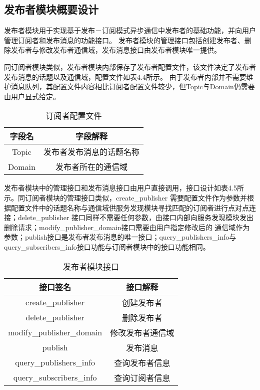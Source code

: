 \subsection{发布者模块概要设计}
发布者模块用于实现基于发布－订阅模式异步通信中发布者的基础功能，并向用户管理订阅者和发布消息的功能接口。
发布者模块的管理接口包括创建发布者、删除发布者与修改发布者通信域，发布消息接口由发布者模块唯一提供。

同订阅者模块类似，发布者模块内部保存了发布者配置文件，该文件决定了发布者发布消息的话题以及通信域，配置文件如表4.4所示。
由于发布者内部并不需要维护消息队列，其配置文件内容相比订阅者配置文件较少，但Topic与Domain仍需要由用户显式给定。
\begin{table}[htb]
  \centering\small
  \caption{订阅者配置文件}
  \label{tab:exampletable}
  \begin{tabular}{cc}
    \toprule
    字段名 & 字段解释 \\
    \midrule
    Topic & 发布者发布消息的话题名称\\
    Domain & 发布者所在的通信域\\
    \bottomrule
  \end{tabular}
\end{table}

发布者模块中的管理接口和发布消息接口由用户直接调用，接口设计如表4.5所示。同订阅者模块的管理接口类似，create\_publisher
需要配置文件作为参数并根据配置文件中的话题名称与通信域供服务发现模块寻找匹配的订阅者进行点对点连接；delete\_publisher
接口同样不需要任何参数，由接口内部向服务发现模块发出删除请求；modify\_publisher\_domain接口需要由用户指定修改后的
通信域作为参数；publish接口是发布者发布消息的唯一接口；query\_publishers\_info与query\_subscribers\_info接口功能与订阅者模块中的接口功能相同。
\begin{table}[htb]
  \centering\small
  \caption{发布者模块接口}
  \label{tab:exampletable}
  \begin{tabular}{cc}
    \toprule
    接口签名 & 接口解释 \\
    \midrule
    create\_publisher & 创建发布者\\
    delete\_publisher & 删除发布者\\
    modify\_publisher\_domain & 修改发布者通信域\\
    publish & 发布消息 \\
    query\_publishers\_info & 查询发布者信息\\
    query\_subscribers\_info & 查询订阅者信息\\
    \bottomrule
  \end{tabular}
\end{table}

